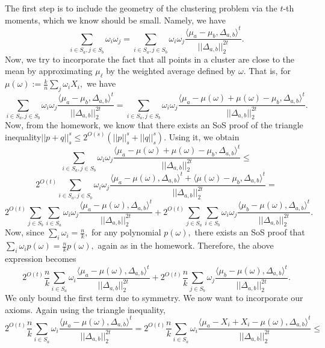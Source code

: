 \documentclass[12pt]{article}%
\begin{document}
\noindent
The first step is to include the geometry of the clustering problem via the $t$-th moments, which we know should be small. Namely, we have 
$$
\sum_{i \in S_a, j \in S_b}
\omega_i\omega_j = 
\sum_{i \in S_a, j \in S_b}
\omega_i\omega_j
\frac{\langle \mu_a - \mu_b, \Delta_{a,b}\rangle^t}{||\Delta_{a,b}||_2^{2t}}.
$$
Now, we try to incorporate the fact that 
all points in a cluster are close to 
the mean by approximating $\mu_\ell$ by the weighted average defined by $\omega.$ That is, for $\mu(\omega):=\frac{k}{n}\sum_{j}\omega_i X_i,$ we have 
$$
\sum_{i \in S_a, j \in S_b}
\omega_i\omega_j
\frac{\langle \mu_a - \mu_b, \Delta_{a,b}\rangle^t}{||\Delta_{a,b}||_2^{2t}} = 
\sum_{i \in S_a, j \in S_b}
\omega_i\omega_j
\frac{\langle \mu_a -\mu(\omega) + \mu(\omega)- \mu_b, \Delta_{a,b}\rangle^t}{||\Delta_{a,b}||_2^{2t}}.
$$
Now, from the homework, we know that there exists an SoS proof of the triangle inequality\linebreak $||p + q||_s^s\le 
2^{O(s)}(||p||_s^s + ||q||_s^s).
$
Using it, we obtain 
$$
\sum_{i \in S_a, j \in S_b}
\omega_i\omega_j
\frac{\langle \mu_a -\mu(\omega) + \mu(\omega)- \mu_b, \Delta_{a,b}\rangle^t}{||\Delta_{a,b}||_2^{2t}} \le 
$$
$$
2^{O(t)}
\sum_{i \in S_a, j \in S_b}
\omega_i\omega_j
\frac{\langle \mu_a -\mu(\omega), \Delta_{a,b}\rangle^t + 
\langle \mu(\omega) - \mu_b, \Delta_{a,b}\rangle^t
}{||\Delta_{a,b}||_2^{2t}} = 
$$
$$
2^{O(t)}\sum_{j \in S_b}\sum_{i \in S_a} 
\omega_i\omega_j
\frac{\langle \mu_a -\mu(\omega), \Delta_{a,b}\rangle^t
}{||\Delta_{a,b}||_2^{2t}} + 
2^{O(t)}\sum_{j \in S_a}\sum_{i \in S_b} 
\omega_i\omega_j
\frac{\langle \mu_b -\mu(\omega), \Delta_{a,b}\rangle^t
}{||\Delta_{a,b}||_2^{2t}}.
$$
Now, since $\sum_{i}\omega_i = \frac{n}{k},$ for any polynomial $p(\omega),$ there exists an SoS proof that $\sum_i \omega_i p(\omega) = \frac{n}{k}p(\omega),$ again as in the homework. Therefore, the above expression becomes
$$
2^{O(t)}\frac{n}{k}\sum_{i \in S_a} 
\omega_i
\frac{\langle \mu_a -\mu(\omega), \Delta_{a,b}\rangle^t
}{||\Delta_{a,b}||_2^{2t}} + 
2^{O(t)}\frac{n}{k}\sum_{j \in S_b} 
\omega_j
\frac{\langle \mu_b -\mu(\omega), \Delta_{a,b}\rangle^t
}{||\Delta_{a,b}||_2^{2t}}.
$$
We only bound the first term due to symmetry. We now want to incorporate our axioms. Again using the triangle inequality, 
$$
2^{O(t)}\frac{n}{k}\sum_{i \in S_a} 
\omega_i
\frac{\langle \mu_a -\mu(\omega), \Delta_{a,b}\rangle^t
}{||\Delta_{a,b}||_2^{2t}} = 
2^{O(t)}\frac{n}{k}\sum_{i \in S_a} 
\omega_i
\frac{\langle \mu_a -X_i + X_i - \mu(\omega), \Delta_{a,b}\rangle^t
}{||\Delta_{a,b}||_2^{2t}}\le
$$
\end{document}
